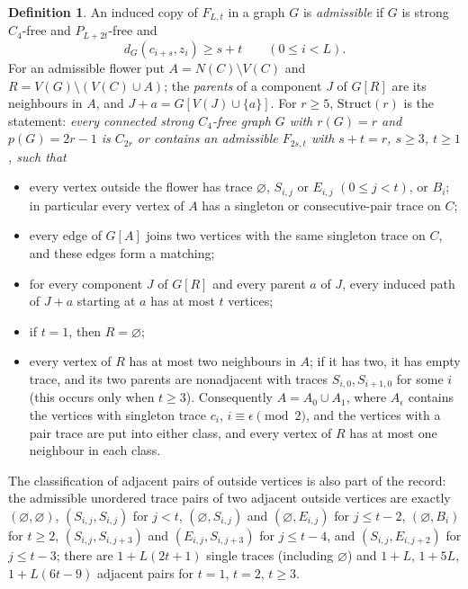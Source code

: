 \documentclass[11pt]{amsart}
\theoremstyle{definition}
\newtheorem{definition}[theorem]{Definition}
\theoremstyle{remark}
\newcommand{\pp}{p}
\begin{document}
\begin{definition}\label{def:struct}
An induced copy of $F_{L,t}$ in a graph $G$ is \emph{admissible} if $G$ is strong $C_4$-free and $P_{L+2t}$-free and
\begin{equation}\label{eq:D}
d_G(c_{i+s},z_i)\ge s+t\qquad(0\le i<L).
\end{equation}
For an admissible flower put $A=N(C)\setminus V(C)$ and $R=V(G)\setminus(V(C)\cup A)$; the \emph{parents} of a component $J$ of $G[R]$ are its neighbours in $A$, and $J+a=G[V(J)\cup\{a\}]$. For $r\ge5$, $\mathrm{Struct}(r)$ is the statement: \emph{every connected strong $C_4$-free graph $G$ with $r(G)=r$ and $\pp(G)=2r-1$ is $C_{2r}$ or contains an admissible $F_{2s,t}$ with $s+t=r$, $s\ge3$, $t\ge1$, such that}
\begin{itemize}
\item[(S1)] every vertex outside the flower has trace $\varnothing$, $S_{i,j}$ or $E_{i,j}$ $(0\le j<t)$, or $B_i$; in particular every vertex of $A$ has a singleton or consecutive-pair trace on $C$;
\item[(S2)] every edge of $G[A]$ joins two vertices with the same singleton trace on $C$, and these edges form a matching;
\item[(S3)] for every component $J$ of $G[R]$ and every parent $a$ of $J$, every induced path of $J+a$ starting at $a$ has at most $t$ vertices;
\item[(S4)] if $t=1$, then $R=\varnothing$;
\item[(S5)] every vertex of $R$ has at most two neighbours in $A$; if it has two, it has empty trace, and its two parents are nonadjacent with traces $S_{i,0},S_{i+1,0}$ for some $i$ \textup{(}this occurs only when $t\ge3$\textup{)}. Consequently $A=A_0\cup A_1$, where $A_\epsilon$ contains the vertices with singleton trace $c_i$, $i\equiv\epsilon\pmod2$, and the vertices with a pair trace are put into either class, and every vertex of $R$ has at most one neighbour in each class.
\end{itemize}
\end{definition}

The classification of adjacent pairs of outside vertices is also part of the record: the admissible unordered trace pairs of two adjacent outside vertices are exactly $(\varnothing,\varnothing)$, $(S_{i,j},S_{i,j})$ for $j<t$, $(\varnothing,S_{i,j})$ and $(\varnothing,E_{i,j})$ for $j\le t-2$, $(\varnothing,B_i)$ for $t\ge2$, $(S_{i,j},S_{i,j+3})$ and $(E_{i,j},S_{i,j+3})$ for $j\le t-4$, and $(S_{i,j},E_{i,j+2})$ for $j\le t-3$; there are $1+L(2t+1)$ single traces (including $\varnothing$) and $1+L$, $1+5L$, $1+L(6t-9)$ adjacent pairs for $t=1$, $t=2$, $t\ge3$.
\end{document}
